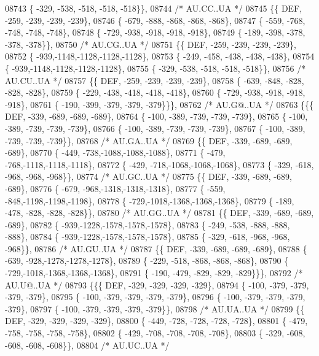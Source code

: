 \begin{DoxyCode}
08743 \{ -329, -538, -518, -518, -518\}\},
08744 \textcolor{comment}{/* AU.CC..UA */}
08745 \{\{  DEF, -259, -239, -239, -239\},
08746 \{ -679, -888, -868, -868, -868\},
08747 \{ -559, -768, -748, -748, -748\},
08748 \{ -729, -938, -918, -918, -918\},
08749 \{ -189, -398, -378, -378, -378\}\},
08750 \textcolor{comment}{/* AU.CG..UA */}
08751 \{\{  DEF, -259, -239, -239, -239\},
08752 \{ -939,-1148,-1128,-1128,-1128\},
08753 \{ -249, -458, -438, -438, -438\},
08754 \{ -939,-1148,-1128,-1128,-1128\},
08755 \{ -329, -538, -518, -518, -518\}\},
08756 \textcolor{comment}{/* AU.CU..UA */}
08757 \{\{  DEF, -259, -239, -239, -239\},
08758 \{ -639, -848, -828, -828, -828\},
08759 \{ -229, -438, -418, -418, -418\},
08760 \{ -729, -938, -918, -918, -918\},
08761 \{ -190, -399, -379, -379, -379\}\}\},
08762 \textcolor{comment}{/* AU.G@..UA */}
08763 \{\{\{  DEF, -339, -689, -689, -689\},
08764 \{ -100, -389, -739, -739, -739\},
08765 \{ -100, -389, -739, -739, -739\},
08766 \{ -100, -389, -739, -739, -739\},
08767 \{ -100, -389, -739, -739, -739\}\},
08768 \textcolor{comment}{/* AU.GA..UA */}
08769 \{\{  DEF, -339, -689, -689, -689\},
08770 \{ -449, -738,-1088,-1088,-1088\},
08771 \{ -479, -768,-1118,-1118,-1118\},
08772 \{ -429, -718,-1068,-1068,-1068\},
08773 \{ -329, -618, -968, -968, -968\}\},
08774 \textcolor{comment}{/* AU.GC..UA */}
08775 \{\{  DEF, -339, -689, -689, -689\},
08776 \{ -679, -968,-1318,-1318,-1318\},
08777 \{ -559, -848,-1198,-1198,-1198\},
08778 \{ -729,-1018,-1368,-1368,-1368\},
08779 \{ -189, -478, -828, -828, -828\}\},
08780 \textcolor{comment}{/* AU.GG..UA */}
08781 \{\{  DEF, -339, -689, -689, -689\},
08782 \{ -939,-1228,-1578,-1578,-1578\},
08783 \{ -249, -538, -888, -888, -888\},
08784 \{ -939,-1228,-1578,-1578,-1578\},
08785 \{ -329, -618, -968, -968, -968\}\},
08786 \textcolor{comment}{/* AU.GU..UA */}
08787 \{\{  DEF, -339, -689, -689, -689\},
08788 \{ -639, -928,-1278,-1278,-1278\},
08789 \{ -229, -518, -868, -868, -868\},
08790 \{ -729,-1018,-1368,-1368,-1368\},
08791 \{ -190, -479, -829, -829, -829\}\}\},
08792 \textcolor{comment}{/* AU.U@..UA */}
08793 \{\{\{  DEF, -329, -329, -329, -329\},
08794 \{ -100, -379, -379, -379, -379\},
08795 \{ -100, -379, -379, -379, -379\},
08796 \{ -100, -379, -379, -379, -379\},
08797 \{ -100, -379, -379, -379, -379\}\},
08798 \textcolor{comment}{/* AU.UA..UA */}
08799 \{\{  DEF, -329, -329, -329, -329\},
08800 \{ -449, -728, -728, -728, -728\},
08801 \{ -479, -758, -758, -758, -758\},
08802 \{ -429, -708, -708, -708, -708\},
08803 \{ -329, -608, -608, -608, -608\}\},
08804 \textcolor{comment}{/* AU.UC..UA */}

\end{DoxyCode}
